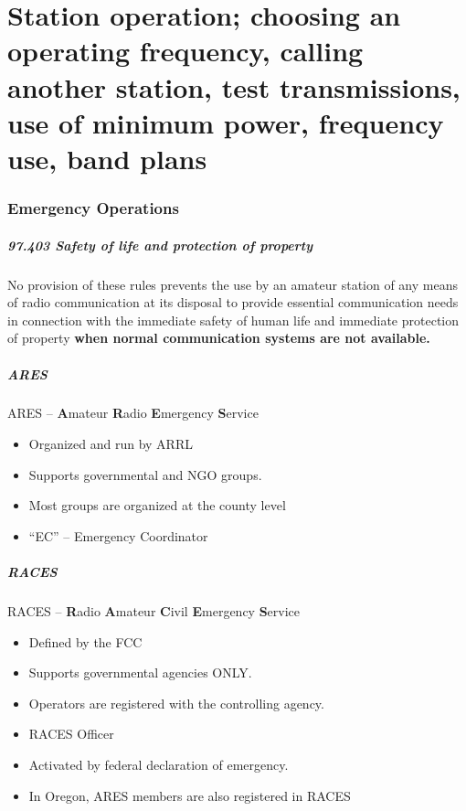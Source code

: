 \documentclass[10pt]{beamer}
\begin{document}
\part{Station operation; choosing an operating frequency, calling another station, test transmissions, use of minimum power, frequency use, band plans}

\section{Emergency Operations}
\begin{frame}
\frametitle{97.403 Safety of life and protection of property}
No provision of these rules prevents the use by an amateur station of any means of radio communication at its disposal to provide essential communication needs in connection with the immediate safety of human life and immediate protection of property \textbf<2->{when normal communication systems are not available.}
\end{frame}

\begin{frame}
\frametitle{ARES}
ARES – \textbf{A}mateur \textbf{R}adio \textbf{E}mergency \textbf{S}ervice
\begin{itemize}
\item Organized and run by ARRL
\item Supports governmental and NGO groups.
\item Most groups are organized at the county level
\item “EC” – Emergency Coordinator
\end{itemize}
\end{frame}

\begin{frame}
\frametitle{RACES}
RACES – \textbf{R}adio \textbf{A}mateur \textbf{C}ivil \textbf{E}mergency \textbf{S}ervice
\begin{itemize}
\item Defined by the FCC
\item Supports governmental agencies ONLY.
\item Operators are registered with the controlling agency. 
\item RACES Officer
\item Activated by federal declaration of emergency. 
\item In Oregon, ARES members are also registered in RACES
\end{itemize}
\end{frame}
\end{document}
